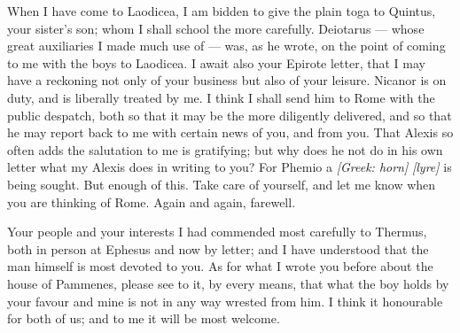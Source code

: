  When I have come to Laodicea, I am bidden to give the plain toga to Quintus, your sister's son; whom I shall school the more carefully. Deiotarus --- whose great auxiliaries I made much use of --- was, as he wrote, on the point of coming to me with the boys to Laodicea. I await also your Epirote letter, that I may have a reckoning not only of your business but also of your leisure. Nicanor is on duty, and is liberally treated by me. I think I shall send him to Rome with the public despatch, both so that it may be the more diligently delivered, and so that he may report back to me with certain news of you, and from you. That Alexis so often adds the salutation to me is gratifying; but why does he not do in his own letter what my Alexis does in writing to you? For Phemio a \textit{[Greek: horn]} \textit{[lyre]} is being sought. But enough of this. Take care of yourself, and let me know when you are thinking of Rome. Again and again, farewell.

 Your people and your interests I had commended most carefully to Thermus, both in person at Ephesus and now by letter; and I have understood that the man himself is most devoted to you. As for what I wrote you before about the house of Pammenes, please see to it, by every means, that what the boy holds by your favour and mine is not in any way wrested from him. I think it honourable for both of us; and to me it will be most welcome.
